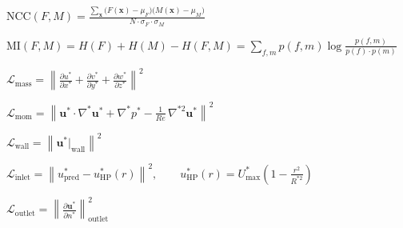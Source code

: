 \documentclass[12pt, border=10pt]{standalone}
\begin{document}



$\displaystyle
\text{NCC}(F, M) = \frac{\sum_{\mathbf{x}} \big(F(\mathbf{x}) - \mu_F\big)\big(M(\mathbf{x}) - \mu_M\big)}{N \cdot \sigma_F \cdot \sigma_M}
$



$\displaystyle
\text{MI}(F, M) = H(F) + H(M) - H(F, M) = \sum_{f,m} p(f,m) \log \frac{p(f,m)}{p(f) \cdot p(m)}
$



$\displaystyle
\mathcal{L}_{\text{mass}} = \left\| \frac{\partial u^*}{\partial x^*} + \frac{\partial v^*}{\partial y^*} + \frac{\partial w^*}{\partial z^*} \right\|^2
$



$\displaystyle
\mathcal{L}_{\text{mom}} = \left\| \mathbf{u}^* \cdot \nabla^* \mathbf{u}^* + \nabla^* p^* - \frac{1}{Re}\, \nabla^{*2} \mathbf{u}^* \right\|^2
$



$\displaystyle
\mathcal{L}_{\text{wall}} = \left\| \mathbf{u}^*\big|_{\text{wall}} \right\|^2
$



$\displaystyle
\mathcal{L}_{\text{inlet}} = \left\| u^*_{\text{pred}} - u^*_{\text{HP}}(r) \right\|^2, \qquad u^*_{\text{HP}}(r) = U_{\max}^* \left(1 - \frac{r^2}{R^{*2}}\right)
$



$\displaystyle
\mathcal{L}_{\text{outlet}} = \left\| \frac{\partial \mathbf{u}^*}{\partial n^*} \right\|^2_{\text{outlet}}
$
\end{document}
